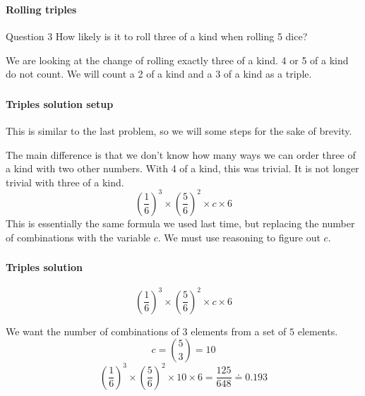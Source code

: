 \documentclass[mathserif]{beamer}
\newenvironment{namedframe}[1]%
	{\begin{frame}\frametitle{\secname}\framesubtitle{#1}}
	{\end{frame}}
\begin{document}
	\begin{namedframe}{Rolling triples}
		\begin{exampleblock}{Question 3}
			How likely is it to roll three of a kind when rolling 5 dice?
		\end{exampleblock}
		We are looking at the change of rolling \alert{exactly} three of a kind. 4 or 5 of a kind do \alert{not} count. We \alert{will} count a 2 of a kind and a 3 of a kind as a triple.
	\end{namedframe}
	\begin{namedframe}{Triples solution setup}
		This is similar to the last problem, so we will some steps for the sake of brevity.
		\pause

		The main difference is that we don't know how many ways we can order three of a kind with two other numbers. With 4 of a kind, this was trivial. It is not longer trivial with three of a kind.
		\[\left(\frac{1}{6}\right)^3 \times \left(\frac{5}{6}\right)^2 \times c \times 6\]
		This is essentially the same formula we used last time, but replacing the number of combinations with the variable $c$. We must use reasoning to figure out $c$.
	\end{namedframe}
	\begin{namedframe}{Triples solution}
		\[\left(\frac{1}{6}\right)^3 \times \left(\frac{5}{6}\right)^2 \times c \times 6\]
		\pause

		We want the number of combinations of $3$ elements from a set of $5$ elements.
		\pause
		\[c = \binom{5}{3} = 10\]
		\pause
		\[\left(\frac{1}{6}\right)^3 \times \left(\frac{5}{6}\right)^2 \times 10 \times 6 = \frac{125}{648} \doteq 0.193\]
	\end{namedframe}
\end{document}
